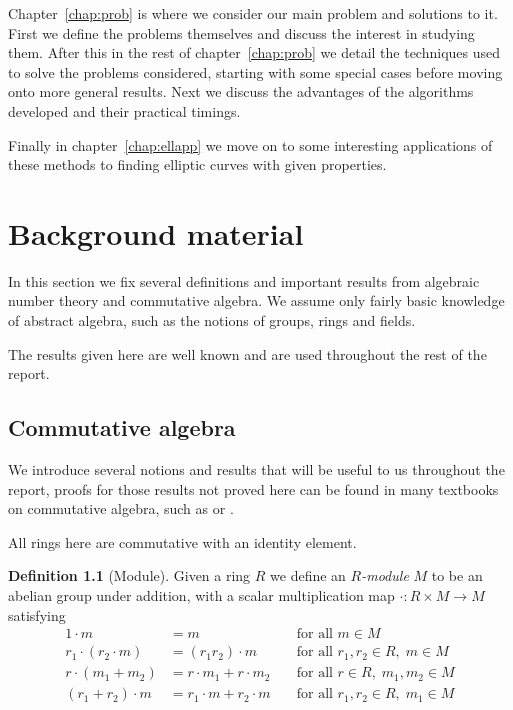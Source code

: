 \documentclass[12pt,a4paper,abstracton,bibtotoc]{scrreprt}
\theoremstyle{definition}
\newtheorem{defn}{Definition}
\begin{document}
Chapter~\ref{chap:prob} is where we consider our main problem and solutions to it.
First we define the problems themselves and discuss the interest in studying them.
After this in the rest of chapter~\ref{chap:prob} we detail the techniques used to solve the problems considered, starting with some special cases before moving onto more general results.
Next we discuss the advantages of the algorithms developed and their practical timings.

Finally in chapter~\ref{chap:ellapp} we move on to some interesting applications of these methods to finding elliptic curves with given properties.


\chapter{Background material}
\label{chap:background}

In this section we fix several definitions and important results from algebraic number theory and commutative algebra.
We assume only fairly basic knowledge of abstract algebra, such as the notions of groups, rings and fields.

The results given here are well known and are used throughout the rest of the report.

\section{Commutative algebra}
\label{sec:ca}
We introduce several notions and results that will be useful to us throughout the report, proofs for those results not proved here can be found in many textbooks on commutative algebra, such as \cite{am} or \cite{matsumura}.

All rings here are commutative with an identity element.
\begin{defn}[Module]
Given a ring $R$ we define an \emph{$R$-module} $M$ to be an abelian group under addition, with a scalar multiplication map $\cdot \colon R\times M \to M$ satisfying
\begin{align*}
1\cdot m &= m \; &&\text{for all } m\in M \\
r_1\cdot(r_2 \cdot m) &= (r_1r_2)\cdot m \; &&\text{for all } r_1,r_2\in R,\; m\in M \\
r\cdot(m_1 + m_2) &= r\cdot m_1 + r\cdot m_2 \; &&\text{for all } r\in R, \; m_1,m_2\in M \\
(r_1 + r_2)\cdot m &= r_1\cdot m + r_2\cdot m \; &&\text{for all } r_1,r_2\in R, \; m_1\in M
\end{align*}
\end{defn}
\end{document}

